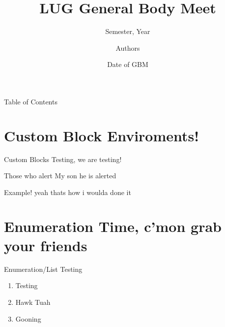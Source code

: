 \documentclass{beamer}
\title{LUG General Body Meet}
\subtitle{Semester, Year}
\date{Date of GBM}
\author{Authors}
\institute{Linux Users Group @ UIC}
\begin{document}
  \begin{frame}
    \titlepage
  \end{frame}

  \begin{frame}{Table of Contents}
    \tableofcontents
  \end{frame}

  \section{Custom Block Enviroments!}
  \begin{frame}{Custom Blocks}
    Testing, we are testing!

    \begin{alertblock}{Those who alert}
      My son he is alerted
    \end{alertblock}
    \begin{exampleblock}{Example!}
      yeah thats how i woulda done it
    \end{exampleblock}
  \end{frame}

  \section{Enumeration Time, c'mon grab your friends}
  \begin{frame}{Enumeration/List Testing}
    \begin{enumerate}
      \item Testing
      \item Hawk Tuah
      \item Gooning
    \end{enumerate}
  \end{frame}
\end{document}
